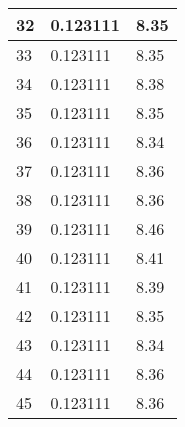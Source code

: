 \begin{table}
\begin{tabular}{ | l | l | l |}
     32 & 0.123111 & 8.35 \\ \hline
     33 & 0.123111 & 8.35 \\ \hline
     34 & 0.123111 & 8.38 \\ \hline
     35 & 0.123111 & 8.35 \\ \hline
     36 & 0.123111 & 8.34 \\ \hline
     37 & 0.123111 & 8.36 \\ \hline
     38 & 0.123111 & 8.36 \\ \hline
     39 & 0.123111 & 8.46 \\ \hline
     40 & 0.123111 & 8.41 \\ \hline
     41 & 0.123111 & 8.39 \\ \hline
     42 & 0.123111 & 8.35 \\ \hline
     43 & 0.123111 & 8.34 \\ \hline
     44 & 0.123111 & 8.36 \\ \hline
     45 & 0.123111 & 8.36 \\ \hline
    \end{tabular}
\label{table:GPU second test}
\end{table}
